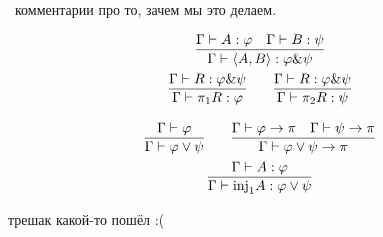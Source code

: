 \todo \ комментарии про то, зачем мы это делаем.

\begin{gather*}
    \infer
        {\Gamma \vdash \left<A,B\right> : \varphi \& \psi}
        {\Gamma \vdash A : \varphi & \Gamma \vdash B : \psi} \\
    \infer
        {\Gamma \vdash \pi_{1} R : \varphi}
        {\Gamma \vdash R : \varphi \& \psi} \qquad
    \infer
        {\Gamma \vdash \pi_{2} R : \psi}
        {\Gamma \vdash R : \varphi \& \psi}
\end{gather*}

\begin{gather*}
    \infer
        {\Gamma \vdash \varphi \vee \psi}
        {\Gamma \vdash \varphi} \qquad
    \infer
        {\Gamma \vdash \varphi \vee \psi \rightarrow \pi}
        {\Gamma \vdash \varphi \rightarrow \pi & \Gamma \vdash \psi \rightarrow \pi} \\
    \infer
        {\Gamma \vdash \mathrm{inj}_{1} A : \varphi \vee \psi}
        {\Gamma \vdash A : \varphi}
\end{gather*}

\todo{} трешак какой-то пошёл :(


